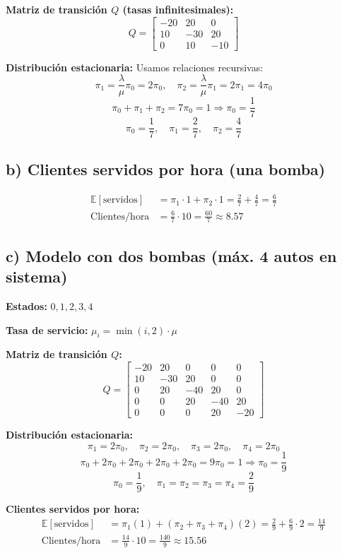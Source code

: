 \documentclass[12pt]{article}
\begin{document}
\textbf{Matriz de transición $Q$ (tasas infinitesimales):}
\[
Q =
\begin{bmatrix}
-20 & 20 & 0 \\
10 & -30 & 20 \\
0 & 10 & -10
\end{bmatrix}
\]

\textbf{Distribución estacionaria:} Usamos relaciones recursivas:
\[
\pi_1 = \frac{\lambda}{\mu} \pi_0 = 2\pi_0, \quad \pi_2 = \frac{\lambda}{\mu} \pi_1 = 2\pi_1 = 4\pi_0
\]
\[
\pi_0 + \pi_1 + \pi_2 = 7\pi_0 = 1 \Rightarrow \pi_0 = \frac{1}{7}
\]
\[
\boxed{\pi_0 = \frac{1}{7}, \quad \pi_1 = \frac{2}{7}, \quad \pi_2 = \frac{4}{7}}
\]

\subsection*{b) Clientes servidos por hora (una bomba)}

\begin{align*}
\mathbb{E}[\text{servidos}] &= \pi_1 \cdot 1 + \pi_2 \cdot 1 = \frac{2}{7} + \frac{4}{7} = \frac{6}{7} \\
\text{Clientes/hora} &= \frac{6}{7} \cdot 10 = \boxed{\frac{60}{7} \approx 8.57}
\end{align*}

\subsection*{c) Modelo con dos bombas (máx. 4 autos en sistema)}

\textbf{Estados:} $0, 1, 2, 3, 4$

\textbf{Tasa de servicio:} $\mu_i = \min(i, 2) \cdot \mu$

\textbf{Matriz de transición $Q$:}
\[
Q =
\begin{bmatrix}
-20 & 20 & 0 & 0 & 0 \\
10 & -30 & 20 & 0 & 0 \\
0 & 20 & -40 & 20 & 0 \\
0 & 0 & 20 & -40 & 20 \\
0 & 0 & 0 & 20 & -20
\end{bmatrix}
\]

\textbf{Distribución estacionaria:}
\[
\pi_1 = 2\pi_0, \quad \pi_2 = 2\pi_0, \quad \pi_3 = 2\pi_0, \quad \pi_4 = 2\pi_0
\]
\[
\pi_0 + 2\pi_0 + 2\pi_0 + 2\pi_0 + 2\pi_0 = 9\pi_0 = 1 \Rightarrow \pi_0 = \frac{1}{9}
\]
\[
\boxed{\pi_0 = \frac{1}{9}, \quad \pi_1 = \pi_2 = \pi_3 = \pi_4 = \frac{2}{9}}
\]

\textbf{Clientes servidos por hora:}
\begin{align*}
\mathbb{E}[\text{servidos}] &= \pi_1(1) + (\pi_2 + \pi_3 + \pi_4)(2) = \frac{2}{9} + \frac{6}{9} \cdot 2 = \frac{14}{9} \\
\text{Clientes/hora} &= \frac{14}{9} \cdot 10 = \boxed{\frac{140}{9} \approx 15.56}
\end{align*}
\end{document}
